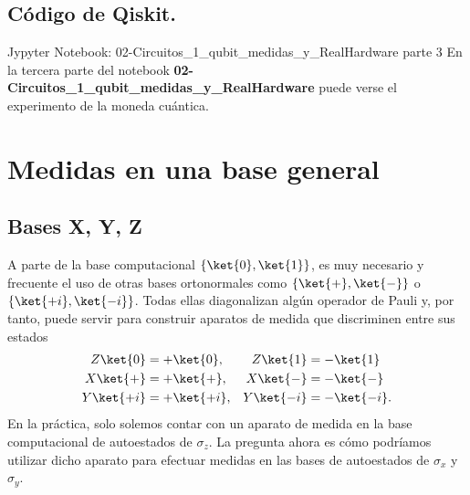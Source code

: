 \documentclass[a4paper,11pt]{book} %
\numberwithin{equation}{chapter}
\begin{document}
		\subsection{Código de Qiskit.}
		
	\begin{mybox_orange}{Jypyter Notebook: 02-Circuitos\_1\_qubit\_medidas\_y\_RealHardware parte 3}
	En la tercera parte del notebook \textbf{02-Circuitos\_1\_qubit\_medidas\_y\_RealHardware} puede verse el experimento de la moneda cuántica.
	\end{mybox_orange}
    
    
    \section{Medidas en una base general}
        \subsection{Bases X, Y, Z} \label{sec_subsub_medidad1_bases_xyz}
       
A parte de la base computacional $\{\ket{0},\ket{1} \}$, es muy necesario y frecuente el uso de otras bases ortonormales como  $\{\ket{+},\ket{-} \}$ o  $\{\ket{+i},\ket{-i} \}$. Todas ellas diagonalizan algún operador de Pauli y, por  tanto, puede servir para construir aparatos de medida que discriminen entre sus estados       
\begin{align}
Z \ket{0} &=+ \ket{0}   , & Z \ket{1} &=-\ket{1} \\ 
X \ket{+} &=+ \ket{+}    ,& X \ket{-} &=-\ket{-} \\ 
Y \ket{+i} &=+ \ket{+i}  ,& Y \ket{-i} &=-\ket{-i}.
\end{align}    
En la práctica, solo solemos contar con un aparato de medida en la base computacional de autoestados de $\sigma_z$. La pregunta ahora es cómo podríamos utilizar  dicho aparato para efectuar medidas en las bases de autoestados de $\sigma_x$ y $\sigma_y$.
\end{document}
